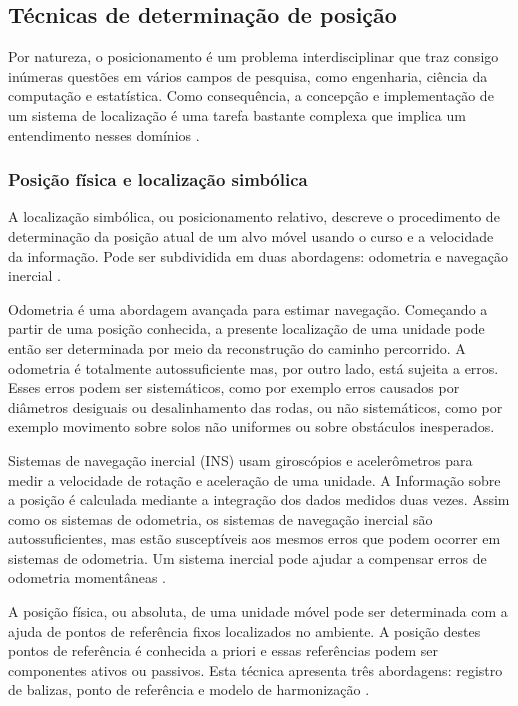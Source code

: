 \subsection{Técnicas de determinação de posição}\label{sec:determ-posic}
Por natureza, o posicionamento é um problema interdisciplinar que traz consigo inúmeras questões em vários campos de pesquisa, como engenharia, ciência da computação e estatística. Como consequência, a concepção e implementação de um sistema de localização é uma tarefa bastante complexa que implica um entendimento nesses domínios \cite{linde2006aspects}. 

\subsubsection{Posição física e localização simbólica}\label{sec:posic-fisica}
A localização simbólica, ou posicionamento relativo, descreve o procedimento de determinação da posição atual de um alvo móvel usando o curso e a velocidade da informação. Pode ser subdividida em duas abordagens: odometria e navegação inercial \cite{linde2006aspects}.

Odometria é uma abordagem avançada para estimar navegação. Começando a partir de uma posição conhecida, a presente localização de uma unidade pode então ser determinada por meio da reconstrução do caminho percorrido. A odometria é totalmente autossuficiente mas, por outro lado, está sujeita a erros. Esses erros podem ser sistemáticos, como por exemplo erros causados por diâmetros desiguais ou desalinhamento das rodas, ou não sistemáticos, como por exemplo movimento sobre solos não uniformes ou sobre obstáculos inesperados. 

Sistemas de navegação inercial (INS) usam giroscópios e acelerômetros para medir a velocidade de rotação e aceleração de uma unidade. A Informação sobre a posição é calculada mediante a integração dos dados medidos duas vezes. Assim como os sistemas de odometria, os sistemas de navegação inercial são autossuficientes, mas estão susceptíveis aos mesmos erros que podem ocorrer em sistemas de odometria. Um sistema inercial pode ajudar a compensar erros de odometria momentâneas \cite{linde2006aspects}.

A posição física, ou absoluta, de uma unidade móvel pode ser determinada com a ajuda de pontos de referência fixos localizados no ambiente. A posição destes pontos de referência é conhecida a priori e essas referências podem ser componentes ativos ou passivos. Esta técnica apresenta três abordagens: registro de balizas, ponto de referência e modelo de harmonização \cite{linde2006aspects}.

